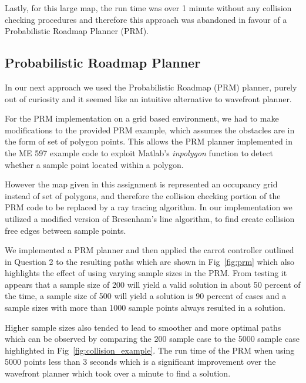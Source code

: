 \documentclass{article}
\begin{document}
Lastly, for this large map, the run time was over 1 minute without any collision checking procedures and therefore this approach was abandoned in favour of a Probabilistic Roadmap Planner (PRM). 


\subsection{Probabilistic Roadmap Planner}
\label{subsec:prm}
In our next approach we used the Probabilistic Roadmap (PRM) planner, purely out of curiosity and it seemed like an intuitive alternative to wavefront planner. 

For the PRM implementation on a grid based environment, we had to make modifications to the provided PRM example, which assumes the obstacles are in the form of set of polygon points. This allows the PRM planner implemented in the ME 597 example code to exploit Matlab's \textit{inpolygon }function to detect whether a sample point located within a polygon. 

However the map given in this assignment is represented an occupancy grid instead of set of polygons, and therefore the collision checking portion of the PRM code to be replaced by a ray tracing algorithm. In our implementation we utilized a modified version of Bresenham's line algorithm, to find create collision free edges between sample points.

We implemented a PRM planner and then applied the carrot controller outlined in Question 2 to the resulting paths which are shown in  Fig~\ref{fig:prm} which also highlights the effect of using varying sample sizes in the PRM. From testing it appears that a sample size of 200 will yield a valid solution in about 50 percent of the time, a sample size of 500 will yield a solution is 90 percent of cases and a sample sizes with more than 1000 sample points always resulted in a solution. 

Higher sample sizes also tended to lead to smoother and more optimal paths which can be observed by comparing  the 200 sample case to the 5000 sample case highlighted in Fig~\ref{fig:collision_example}. The run time of the PRM when using 5000 points less than 3 seconds which is a significant improvement over the wavefront planner which took over a minute to find a solution.  
\end{document}
